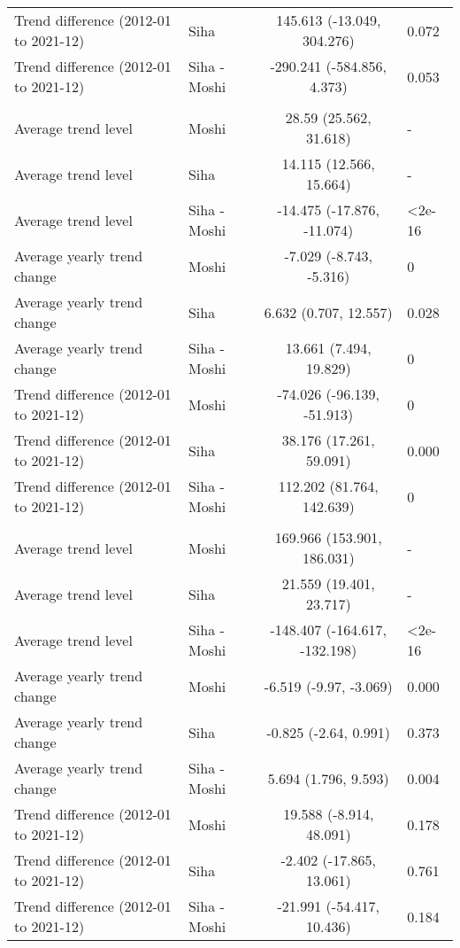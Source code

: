 \begin{longtable}{l|lcl}
Trend difference (2012-01 to 2021-12) & Siha & 145.613 (-13.049, 304.276) & 0.072 \\ 
Trend difference (2012-01 to 2021-12) & Siha - Moshi & -290.241 (-584.856, 4.373) & 0.053 \\ 
\midrule\addlinespace[2.5pt]
\multicolumn{4}{l}{Poisoning} \\ 
\midrule\addlinespace[2.5pt]
Average trend level & Moshi & 28.59 (25.562, 31.618) & - \\ 
Average trend level & Siha & 14.115 (12.566, 15.664) & - \\ 
Average trend level & Siha - Moshi & -14.475 (-17.876, -11.074) & <2e-16 \\ 
Average yearly trend change & Moshi & -7.029 (-8.743, -5.316) & 0 \\ 
Average yearly trend change & Siha & 6.632 (0.707, 12.557) & 0.028 \\ 
Average yearly trend change & Siha - Moshi & 13.661 (7.494, 19.829) & 0 \\ 
Trend difference (2012-01 to 2021-12) & Moshi & -74.026 (-96.139, -51.913) & 0 \\ 
Trend difference (2012-01 to 2021-12) & Siha & 38.176 (17.261, 59.091) & 0.000 \\ 
Trend difference (2012-01 to 2021-12) & Siha - Moshi & 112.202 (81.764, 142.639) & 0 \\ 
\midrule\addlinespace[2.5pt]
\multicolumn{4}{l}{Psychoses} \\ 
\midrule\addlinespace[2.5pt]
Average trend level & Moshi & 169.966 (153.901, 186.031) & - \\ 
Average trend level & Siha & 21.559 (19.401, 23.717) & - \\ 
Average trend level & Siha - Moshi & -148.407 (-164.617, -132.198) & <2e-16 \\ 
Average yearly trend change & Moshi & -6.519 (-9.97, -3.069) & 0.000 \\ 
Average yearly trend change & Siha & -0.825 (-2.64, 0.991) & 0.373 \\ 
Average yearly trend change & Siha - Moshi & 5.694 (1.796, 9.593) & 0.004 \\ 
Trend difference (2012-01 to 2021-12) & Moshi & 19.588 (-8.914, 48.091) & 0.178 \\ 
Trend difference (2012-01 to 2021-12) & Siha & -2.402 (-17.865, 13.061) & 0.761 \\ 
Trend difference (2012-01 to 2021-12) & Siha - Moshi & -21.991 (-54.417, 10.436) & 0.184 \\ 

\end{longtable}

